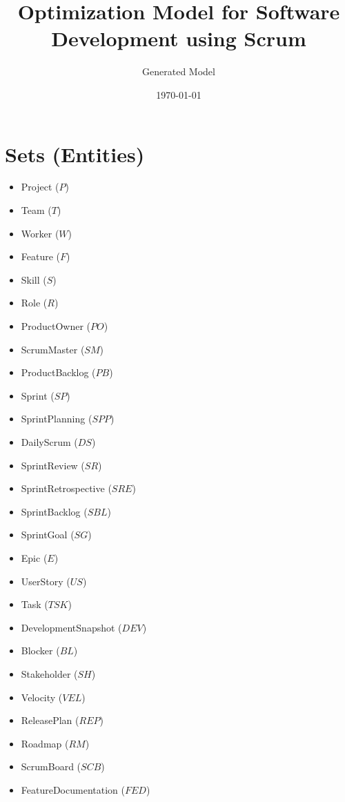 \documentclass{article}
\title{Optimization Model for Software Development using Scrum}
\author{Generated Model}
\date{\today}
\begin{document}
\maketitle
\tableofcontents

\section{Sets (Entities)}
\begin{itemize}
    \item Project ($P$)
    \item Team ($T$)
    \item Worker ($W$)
    \item Feature ($F$)
    \item Skill ($S$)
    \item Role ($R$)
    \item ProductOwner ($PO$)
    \item ScrumMaster ($SM$)
    \item ProductBacklog ($PB$)
    \item Sprint ($SP$)
    \item SprintPlanning ($SPP$)
    \item DailyScrum ($DS$)
    \item SprintReview ($SR$)
    \item SprintRetrospective ($SRE$)
    \item SprintBacklog ($SBL$)
    \item SprintGoal ($SG$)
    \item Epic ($E$)
    \item UserStory ($US$)
    \item Task ($TSK$)
    \item DevelopmentSnapshot ($DEV$)
    \item Blocker ($BL$)
    \item Stakeholder ($SH$)
    \item Velocity ($VEL$)
    \item ReleasePlan ($REP$)
    \item Roadmap ($RM$)
    \item ScrumBoard ($SCB$)
    \item FeatureDocumentation ($FED$)
\end{itemize}
\end{document}
